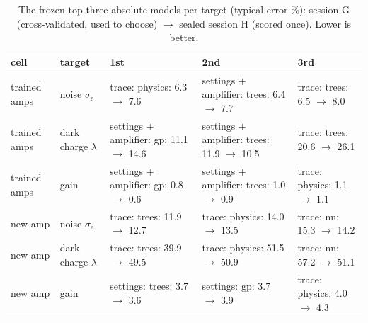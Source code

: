 \begin{table}[H]\centering\scriptsize
\caption{The frozen top three absolute models per target (typical error \%): session G (cross-validated, used to choose) $\to$ sealed session H (scored once). Lower is better.}
\begin{tabular}{llp{4cm}p{4cm}p{4cm}}\toprule
cell & target & 1st & 2nd & 3rd\\\midrule
trained amps & noise $\sigma_e$ & trace: physics: 6.3 $\to$ 7.6 & settings + amplifier: trees: 6.4 $\to$ 7.7 & trace: trees: 6.5 $\to$ 8.0\\
trained amps & dark charge $\lambda$ & settings + amplifier: gp: 11.1 $\to$ 14.6 & settings + amplifier: trees: 11.9 $\to$ 10.5 & trace: trees: 20.6 $\to$ 26.1\\
trained amps & gain & settings + amplifier: gp: 0.8 $\to$ 0.6 & settings + amplifier: trees: 1.0 $\to$ 0.9 & trace: physics: 1.1 $\to$ 1.1\\
new amp & noise $\sigma_e$ & trace: trees: 11.9 $\to$ 12.7 & trace: physics: 14.0 $\to$ 13.5 & trace: nn: 15.3 $\to$ 14.2\\
new amp & dark charge $\lambda$ & trace: trees: 39.9 $\to$ 49.5 & trace: physics: 51.5 $\to$ 50.9 & trace: nn: 57.2 $\to$ 51.1\\
new amp & gain & settings: trees: 3.7 $\to$ 3.6 & settings: gp: 3.7 $\to$ 3.9 & trace: physics: 4.0 $\to$ 4.3\\
\bottomrule\end{tabular}\end{table}

